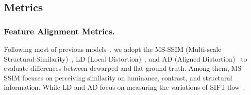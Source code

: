 \subsection{Metrics}
\label{sec:metric}
\subsubsection{Feature Alignment Metrics.} Following most of previous models~\cite{ma2018docunet, das2019dewarpnet, RN58}, we adopt the MS-SSIM (Multi-scale Structural Similarity)~\cite{msssim2003}, LD (Local Distortion)~\cite{ld2017}, and AD (Aligned Distortion)~\cite{RN58} to evaluate differences between dewarped and flat ground truth. Among them, MS-SSIM focuses on perceiving similarity on luminance, contrast, and structural information. While LD and AD focus on measuring the variations of SIFT flow~\cite{liu2010sift}.




